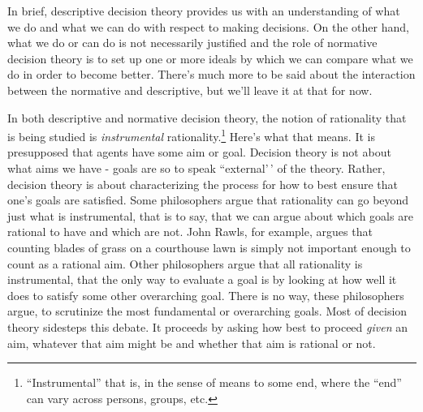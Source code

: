 \documentclass[]{tufte-book}
\begin{document}
In brief, descriptive decision theory provides us with an understanding of what we do and what we can do with respect to making decisions. On the other hand, what we do or can do is not necessarily justified and the role of normative decision theory is to set up one or more ideals by which we can compare what we do in order to become better. There's much more to be said about the interaction between the normative and descriptive, but we'll leave it at that for now.

In both descriptive and normative decision theory, the notion of rationality that is being studied is \emph{instrumental} rationality.\footnote{``Instrumental'' that is, in the sense of means to some end, where the ``end'' can vary across persons, groups, etc.} Here's what that means. It is presupposed that agents have some aim or goal. Decision theory is not about what aims we have - goals are so to speak ``external'\,' of the theory. Rather, decision theory is about characterizing the process for how to best ensure that one's goals are satisfied. Some philosophers argue that rationality can go beyond just what is instrumental, that is to say, that we can argue about which goals are rational to have and which are not. John Rawls, for example, argues that counting blades of grass on a courthouse lawn is simply not important enough to count as a rational aim. Other philosophers argue that all rationality is instrumental, that the only way to evaluate a goal is by looking at how well it does to satisfy some other overarching goal. There is no way, these philosophers argue, to scrutinize the most fundamental or overarching goals. Most of decision theory sidesteps this debate. It proceeds by asking how best to proceed \emph{given} an aim, whatever that aim might be and whether that aim is rational or not.
\end{document}
